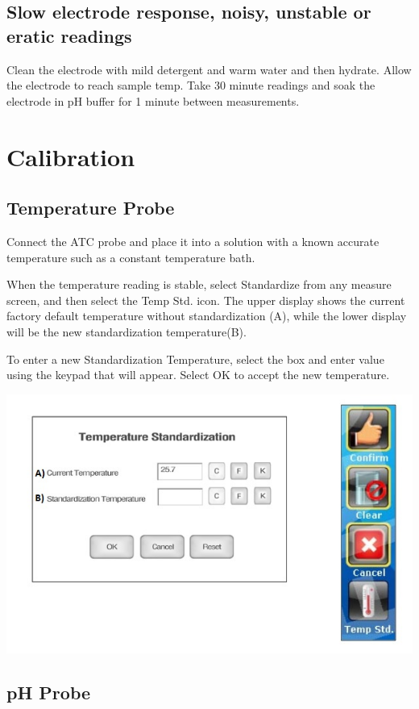 \documentclass[12pt]{../SOP3_beta}\usepackage[]{graphicx}\usepackage[]{color}
\begin{document}
\subsection{Slow electrode response, noisy, unstable or eratic readings}

\NP Clean the electrode with mild detergent and warm water and then hydrate. Allow the electrode to reach sample temp. Take 30 minute readings and soak the electrode in pH buffer for 1 minute between measurements.

\section{Calibration}

\subsection{Temperature Probe}

\NP Connect the ATC probe and place it into a solution with a known accurate temperature such as a constant temperature bath.

\NP When the temperature reading is stable, select Standardize from any measure screen, and then select the Temp Std. icon. The upper display shows the current factory default temperature without standardization (A), while the lower display will be the new standardization temperature(B).

\NP To enter a new Standardization Temperature, select the box and enter value using the keypad that will appear. Select OK to accept the new temperature.

\NP\includegraphics{Tempstandard.jpg}

\subsection{pH Probe}
\end{document}

